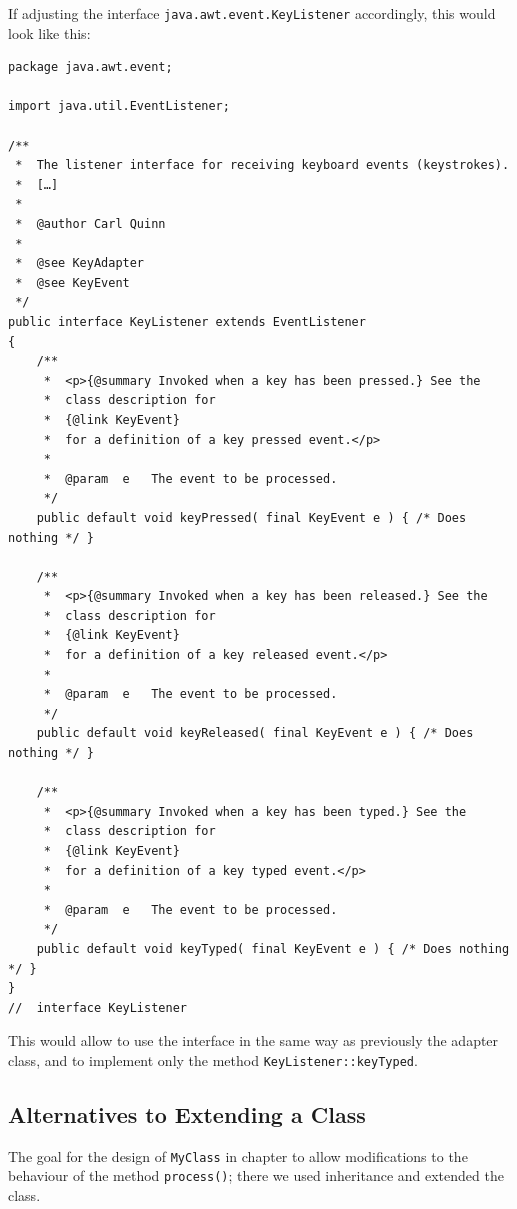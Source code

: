 If adjusting the interface \lstinline|java.awt.event.KeyListener| accordingly, this would look like this:
\begin{lstlisting}
package java.awt.event;

import java.util.EventListener;

/**
 *  The listener interface for receiving keyboard events (keystrokes).
 *  […]
 *
 *  @author Carl Quinn
 *
 *  @see KeyAdapter
 *  @see KeyEvent
 */
public interface KeyListener extends EventListener 
{
    /**
     *  <p>{@summary Invoked when a key has been pressed.} See the
     *  class description for 
     *  {@link KeyEvent}
     *  for a definition of a key pressed event.</p>
     *
     *  @param  e   The event to be processed.
     */
    public default void keyPressed( final KeyEvent e ) { /* Does nothing */ }

    /**
     *  <p>{@summary Invoked when a key has been released.} See the
     *  class description for 
     *  {@link KeyEvent} 
     *  for a definition of a key released event.</p>
     *
     *  @param  e   The event to be processed.
     */
    public default void keyReleased( final KeyEvent e ) { /* Does nothing */ }

    /**
     *  <p>{@summary Invoked when a key has been typed.} See the
     *  class description for 
     *  {@link KeyEvent} 
     *  for a definition of a key typed event.</p>
     *
     *  @param	e   The event to be processed.
     */
    public default void keyTyped( final KeyEvent e ) { /* Does nothing */ }
}
//  interface KeyListener
\end{lstlisting}

This would allow to use the interface in the same way as previously the adapter class, and to implement only the method \lstinline|KeyListener::keyTyped|.


\subsection{Alternatives to Extending a Class}
The goal for the design of \lstinline|MyClass| in chapter  to allow modifications to the behaviour of the method \lstinline|process()|; there we used inheritance and extended the class.


